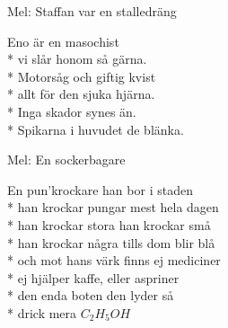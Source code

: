 \begin{SongText}[ENO]
    \begin{SongInfo}
        Mel: Staffan var en stalledräng
    \end{SongInfo}
    \begin{SongVerse}
        Eno är en masochist\\*%
        vi slår honom så gärna.\\*%
        Motorsåg och giftig kvist\\*%
        allt för den sjuka hjärna.\\*%
        Inga skador synes än.\\*%
        Spikarna i huvudet de blänka.
    \end{SongVerse}
\end{SongText}
\begin{SongText}
    \begin{SongInfo}
        Mel: En sockerbagare
    \end{SongInfo}
    \begin{SongVerse}
        En pun’krockare han bor i staden\\*%
        han krockar pungar mest hela dagen\\*%
        han krockar stora han krockar små\\*%
        han krockar några tills dom blir blå\\*%
        och mot hans värk finns ej mediciner\\*%
        ej hjälper kaffe, eller aspriner\\*%
        den enda boten den lyder så\\*%
        drick mera $C_2H_5OH$
    \end{SongVerse}
\end{SongText}

